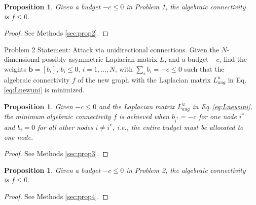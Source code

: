 \documentclass[%
 reprint,
 amsmath,amssymb,
 aip,
]{revtex4-2}
\def \bb {\pmb{b}}
\theoremstyle{italichead}
\newtheorem{proposition}[theorem]{Proposition}
\theoremstyle{definition}
\begin{document}
{\begin{proposition} \label{prop2}
    Given a budget $-c \leq 0$ in Problem 1, the algebraic connectivity is $f \leq 0$.
\end{proposition}
\begin{proof}
    See Methods \ref{sec:prop2}.
\end{proof}




{Problem 2 Statement: Attack via unidirectional connections.} Given the $N$-dimensional possibly asymmetric Laplacian matrix $L$, and a budget $-c$, find the weights $\bb = [b_i]$, $b_i \leq 0$, $i = 1, \hdots, N$, with $\sum_i b_i = -c \leq 0$ such that the algebraic connectivity $f$ of the new graph with the Laplacian matrix $L_{aug}^u$ in Eq.\,\eqref{eq:Lnewuni} is minimized.



\begin{proposition} \label{prop3}
    Given $-c \leq 0$ and the Laplacian matrix $L_{aug}^u$ in Eq.\,\eqref{eq:Lnewuni}, the minimum algebraic connectivity $f$ is achieved when $b_{i^*} = -c$ for one node $i^*$ and $b_i = 0$ for all other nodes $i \neq i^*$, i.e., the entire budget must be allocated to one node.
\end{proposition}
\begin{proof}
    See Methods \ref{sec:prop3}.
\end{proof}









\begin{proposition} \label{prop4}
    Given a budget $-c \leq 0$ in Problem 2, the algebraic connectivity is $f \leq 0$.
\end{proposition}
\begin{proof}
    See Methods \ref{sec:prop4}.
\end{proof}

}
\end{document}
